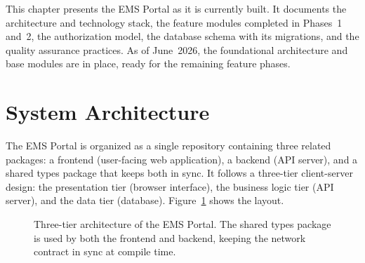 \label{ch:prototyping}

This chapter presents the EMS Portal as it is currently built. It documents the
architecture and technology stack, the feature modules completed in Phases~1 and~2,
the authorization model, the database schema with its migrations, and the quality
assurance practices. As of June~2026, the foundational architecture and base
modules are in place, ready for the remaining feature phases.

\section{System Architecture}
The EMS Portal is organized as a single repository containing three related
packages: a frontend (user-facing web application), a backend (API server), and
a shared types package that keeps both in sync. It follows a three-tier
client-server design: the presentation tier (browser interface), the business
logic tier (API server), and the data tier (database). Figure~\ref{fig:arch}
shows the layout.

\begin{figure}[ht]
	\centering
	\caption{Three-tier architecture of the EMS Portal. The shared types package
		is used by both the frontend and backend, keeping the network contract in
		sync at compile time.}
	\label{fig:arch}
\end{figure}

